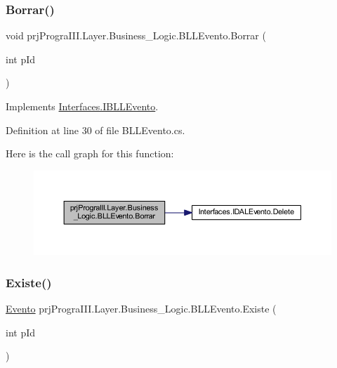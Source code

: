 \subsubsection{\texorpdfstring{Borrar()}{Borrar()}}
{\footnotesize\ttfamily void prj\+Progra\+I\+I\+I.\+Layer.\+Business\+\_\+\+Logic.\+B\+L\+L\+Evento.\+Borrar (\begin{DoxyParamCaption}\item[{int}]{p\+Id }\end{DoxyParamCaption})}



Implements \hyperlink{interface_interfaces_1_1_i_b_l_l_evento_a5e0e267f475664adbac7b86dc847a1a7}{Interfaces.\+I\+B\+L\+L\+Evento}.



Definition at line 30 of file B\+L\+L\+Evento.\+cs.

Here is the call graph for this function\+:
\nopagebreak
\begin{figure}[H]
\begin{center}
\leavevmode
\includegraphics[width=350pt]{classprj_progra_i_i_i_1_1_layer_1_1_business___logic_1_1_b_l_l_evento_a2678321a8382a9304c95e8fc996d088e_cgraph}
\end{center}
\end{figure}
\hypertarget{classprj_progra_i_i_i_1_1_layer_1_1_business___logic_1_1_b_l_l_evento_a5ac56339dc498598e31c5e3dd2c89975}{}\label{classprj_progra_i_i_i_1_1_layer_1_1_business___logic_1_1_b_l_l_evento_a5ac56339dc498598e31c5e3dd2c89975} 
\subsubsection{\texorpdfstring{Existe()}{Existe()}}
{\footnotesize\ttfamily \hyperlink{classprj_progra_i_i_i_1_1_layer_1_1_entities_1_1_evento}{Evento} prj\+Progra\+I\+I\+I.\+Layer.\+Business\+\_\+\+Logic.\+B\+L\+L\+Evento.\+Existe (\begin{DoxyParamCaption}\item[{int}]{p\+Id }\end{DoxyParamCaption})}



